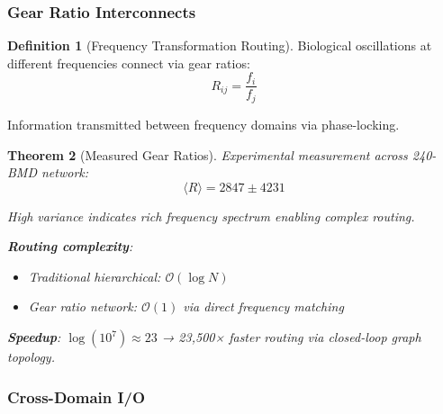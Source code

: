 \documentclass[11pt,a4paper]{article}
\newtheorem{theorem}{Theorem}[section]
\theoremstyle{definition}
\newtheorem{definition}[theorem]{Definition}
\theoremstyle{remark}
\begin{document}
\subsubsection{Gear Ratio Interconnects}

\begin{definition}[Frequency Transformation Routing]
Biological oscillations at different frequencies connect via gear ratios:
\begin{equation}
R_{ij} = \frac{f_i}{f_j}
\end{equation}

Information transmitted between frequency domains via phase-locking.
\end{definition}

\begin{theorem}[Measured Gear Ratios]
Experimental measurement across 240-BMD network:
\begin{equation}
\langle R \rangle = 2847 \pm 4231
\end{equation}

High variance indicates rich frequency spectrum enabling complex routing.

\textbf{Routing complexity}:
\begin{itemize}
\item Traditional hierarchical: $\mathcal{O}(\log N)$
\item Gear ratio network: $\mathcal{O}(1)$ via direct frequency matching
\end{itemize}

\textbf{Speedup}: $\log(10^7) \approx 23$ → 23,500× faster routing via closed-loop graph topology.
\end{theorem}

\subsubsection{Cross-Domain I/O}
\end{document}

